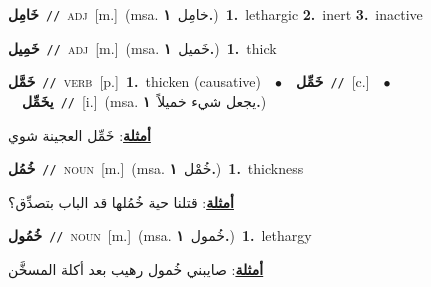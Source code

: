 \documentclass[10pt,a4paper,twoside]{article} %
\begin{document}
\begin{multicols}{2}
{\setlength\topsep{0pt}\textbf{\foreignlanguage{arabic}{خَامِل}}\ {\color{gray}\texttt{//}\color{black}}\ \textsc{adj}\ [m.]\ \color{gray}(msa. \foreignlanguage{arabic}{خامِل}~\foreignlanguage{arabic}{\textbf{١.}})\color{black}\ \textbf{1.}~lethargic  \textbf{2.}~inert  \textbf{3.}~inactive\ } \vspace{2mm}

{\setlength\topsep{0pt}\textbf{\foreignlanguage{arabic}{خَمِيل}}\ {\color{gray}\texttt{//}\color{black}}\ \textsc{adj}\ [m.]\ \color{gray}(msa. \foreignlanguage{arabic}{خَميل}~\foreignlanguage{arabic}{\textbf{١.}})\color{black}\ \textbf{1.}~thick\ } \vspace{2mm}

{\setlength\topsep{0pt}\textbf{\foreignlanguage{arabic}{خَمَّل}}\ {\color{gray}\texttt{//}\color{black}}\ \textsc{verb}\ [p.]\ \textbf{1.}~thicken (causative)\ \ $\bullet$\ \ \setlength\topsep{0pt}\textbf{\foreignlanguage{arabic}{خَمِّل}}\ {\color{gray}\texttt{//}\color{black}}\ [c.]\ \ $\bullet$\ \ \setlength\topsep{0pt}\textbf{\foreignlanguage{arabic}{يخَمِّل}}\ {\color{gray}\texttt{//}\color{black}}\ [i.]\ \color{gray}(msa. \foreignlanguage{arabic}{يجعل شيء خميلاً}~\foreignlanguage{arabic}{\textbf{١.}})\color{black}\  \begin{flushright}\color{gray}\foreignlanguage{arabic}{\textbf{\underline{\foreignlanguage{arabic}{أمثلة}}}: خَمِّل العجينة شوي}\end{flushright}\color{black}} \vspace{2mm}

{\setlength\topsep{0pt}\textbf{\foreignlanguage{arabic}{خُمُل}}\ {\color{gray}\texttt{//}\color{black}}\ \textsc{noun}\ [m.]\ \color{gray}(msa. \foreignlanguage{arabic}{خُمْل}~\foreignlanguage{arabic}{\textbf{١.}})\color{black}\ \textbf{1.}~thickness\  \begin{flushright}\color{gray}\foreignlanguage{arabic}{\textbf{\underline{\foreignlanguage{arabic}{أمثلة}}}: قتلنا حية خُمُلها قد الباب بتصدِّق؟}\end{flushright}\color{black}} \vspace{2mm}

{\setlength\topsep{0pt}\textbf{\foreignlanguage{arabic}{خُمُول}}\ {\color{gray}\texttt{//}\color{black}}\ \textsc{noun}\ [m.]\ \color{gray}(msa. \foreignlanguage{arabic}{خُمول}~\foreignlanguage{arabic}{\textbf{١.}})\color{black}\ \textbf{1.}~lethargy\  \begin{flushright}\color{gray}\foreignlanguage{arabic}{\textbf{\underline{\foreignlanguage{arabic}{أمثلة}}}: صايبني خُمول رهيب بعد أكلة المسخَّن}\end{flushright}\color{black}} \vspace{2mm}


\end{multicols}
\end{document}
